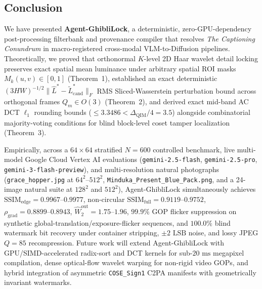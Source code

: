 \documentclass[conference,10pt]{IEEEtran}
\begin{document}
\subsection{Conclusion}
We have presented \textbf{Agent-GhibliLock}, a deterministic, zero-GPU-dependency post-processing filterbank and provenance compiler that resolves \emph{The Captioning Conundrum} in macro-registered cross-modal VLM-to-Diffusion pipelines. Theoretically, we proved that orthonormal $K$-level 2D Haar wavelet detail locking preserves exact spatial mean luminance under arbitrary spatial ROI masks $M_k(u,v) \in [0,1]$ (Theorem~1), established an exact deterministic $(3HW)^{-1/2}\|\widehat{L}^* - \widetilde{L}^*_{\text{cand}}\|_F$ RMS Sliced-Wasserstein perturbation bound across orthogonal frames $Q_m \in O(3)$ (Theorem~2), and derived exact mid-band AC DCT $\ell_1$ rounding bounds ($\le 3.3486 < \Delta_{\text{QIM}}/4 = 3.5$) alongside combinatorial majority-voting conditions for blind block-level coset tamper localization (Theorem~3).

Empirically, across a $64\times 64$ stratified $N=600$ controlled benchmark, live multi-model Google Cloud Vertex AI evaluations (\texttt{gemini-2.5-flash}, \texttt{gemini-2.5-pro}, \texttt{gemini-3-flash-preview}), and multi-resolution natural photographs (\texttt{grace\_hopper.jpg} at $64^2\text{--}512^2$, \texttt{Minduka\_Present\_Blue\_Pack.png}, and a 24-image natural suite at $128^2$ and $512^2$), Agent-GhibliLock simultaneously achieves $\mathrm{SSIM}_{\text{edge}} = 0.9967\text{--}0.9977$, non-circular $\mathrm{SSIM}_{\text{full}} = 0.9119\text{--}0.9752$, $\rho_{\text{grad}} = 0.8899\text{--}0.8943$, $\widehat{W}_2^{\text{out}} = 1.75\text{--}1.96$, $99.9\%$ GOP flicker suppression on synthetic global-translation/exposure-flicker sequences, and $100.0\%$ blind watermark bit recovery under container stripping, $\pm 2\text{ LSB}$ noise, and lossy JPEG $Q=85$ recompression. Future work will extend Agent-GhibliLock with GPU/SIMD-accelerated radix-sort and DCT kernels for sub-$20\text{ ms}$ megapixel compilation, dense optical-flow wavelet warping for non-rigid video GOPs, and hybrid integration of asymmetric \texttt{COSE\_Sign1} C2PA manifests with geometrically invariant watermarks.
\end{document}
